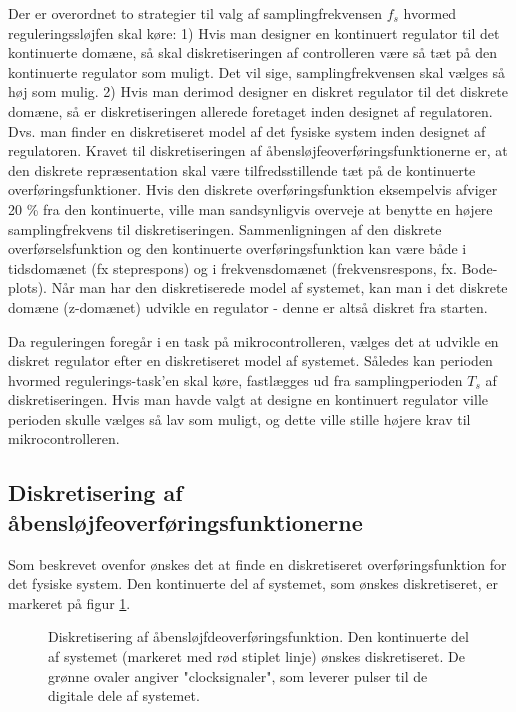 Der er overordnet to strategier til valg af samplingfrekvensen \(f_s\) hvormed
reguleringssløjfen skal køre:
1) Hvis man designer en kontinuert regulator til det kontinuerte domæne, så
skal diskretiseringen af controlleren være så tæt på den kontinuerte regulator som muligt.
Det vil sige, samplingfrekvensen skal vælges så høj som mulig.
2) Hvis man derimod designer en diskret regulator til det diskrete domæne,
så er diskretiseringen allerede foretaget inden designet af regulatoren.
Dvs. man finder en diskretiseret model af det fysiske system inden designet af regulatoren.
Kravet til diskretiseringen af åbensløjfeoverføringsfunktionerne er, at den diskrete repræsentation
skal være tilfredsstillende tæt på de kontinuerte overføringsfunktioner.
Hvis den diskrete overføringsfunktion eksempelvis afviger 20 \% fra den kontinuerte, ville man
sandsynligvis overveje at benytte en højere samplingfrekvens til diskretiseringen.
Sammenligningen af den diskrete overførselsfunktion og den kontinuerte overføringsfunktion
kan være både i tidsdomænet (fx steprespons) og i frekvensdomænet (frekvensrespons, fx. Bode-plots).
Når man har den diskretiserede model af systemet, kan man i det diskrete domæne (z-domænet)
udvikle en regulator - denne er altså diskret fra starten.

Da reguleringen foregår i en task på mikrocontrolleren, vælges det
at udvikle en diskret regulator efter en diskretiseret model af systemet.
Således kan perioden hvormed regulerings-task'en skal køre, fastlægges ud fra
samplingperioden \(T_s\) af diskretiseringen. Hvis man havde valgt at designe en kontinuert regulator
ville perioden skulle vælges så lav som muligt, og dette ville stille højere krav
til mikrocontrolleren.

\subsection{Diskretisering af åbensløjfeoverføringsfunktionerne}
Som beskrevet ovenfor ønskes det at finde en diskretiseret overføringsfunktion
for det fysiske system. Den kontinuerte del af systemet, som ønskes diskretiseret,
er markeret på figur \ref{fig:digitalkontroller2}.
\begin{figure}[!th]
\centering
\begin{tikzpicture}[scale=0.8, every node/.style={scale=0.8}, node distance=2.6cm, =>latex']

\end{tikzpicture}
\caption[Diskretisering af åbensløjfeoverføringsfunktion]{Diskretisering af åbensløjfdeoverføringsfunktion.
	Den kontinuerte del af systemet (markeret med rød stiplet linje) ønskes diskretiseret.
	De grønne ovaler angiver "clocksignaler", som leverer pulser til de digitale dele af systemet.}
\label{fig:digitalkontroller2}
\end{figure}

